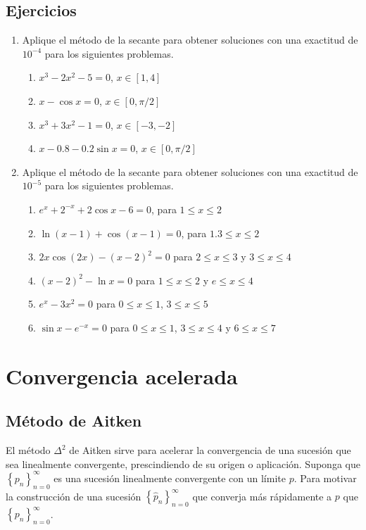 \subsection*{Ejercicios}
\begin{enumerate}
	\item Aplique el método de la secante para obtener soluciones con una exactitud de $10^{-4}$ para los siguientes problemas.
		\begin{enumerate}
			\item $x^{3} - 2x^{2} -5 = 0$, $x\in [1,4]$
			\item $x - \cos x = 0$, $x\in [0, \pi/2]$
			\item $x^{3} + 3x^{2} - 1 = 0$, $x\in [-3, -2]$
			\item $x - 0.8 - 0.2\sin x = 0$, $x\in [0, \pi/2]$
		\end{enumerate}
		
		\item Aplique el método de la secante para obtener soluciones con una exactitud de $10^{-5}$ para los siguientes problemas. 
			\begin{enumerate}
				\item $e^{x} + 2^{-x} + 2\cos x - 6 = 0$, para $1\leq x\leq 2$
				\item $\ln (x-1) + \cos (x-1) = 0$, para $1.3\leq x\leq 2$
				\item $2x\cos (2x) - (x-2)^2 = 0$ para $2\leq x\leq 3$ y $3\leq x\leq 4$
				\item $(x-2)^2 - \ln x = 0$ para $1\leq x\leq 2$ y $e\leq x\leq 4$
				\item $e^{x} - 3x^2 = 0$ para $0\leq x\leq 1$, $3\leq x\leq 5$
				\item $\sin x - e^{-x} = 0$ para $0\leq x\leq 1$, $3\leq x\leq 4$ y $6\leq x\leq 7$
			\end{enumerate}		
\end{enumerate}

\section{Convergencia acelerada}

\subsection{Método de Aitken}
El método $\Delta^2$ de Aitken sirve para acelerar la convergencia de una sucesión que sea linealmente convergente, prescindiendo
de su origen o aplicación. Suponga que $\left\lbrace p_n\right\rbrace_{n=0}^\infty$ es una sucesión linealmente convergente con 
un límite $p$. Para motivar la construcción de una sucesión $\left\lbrace \hat{p}_n\right\rbrace_{n=0}^\infty$ que converja más 
rápidamente a $p$ que $\left\lbrace p_n\right\rbrace_{n=0}^\infty$.

